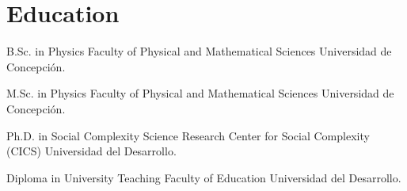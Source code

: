 \section{Education}
            {B.Sc. in Physics}
            {Faculty of Physical and Mathematical Sciences}
            {Universidad de Concepción.}
            {}
            {} 

    \vspace{8pt}
    
            {M.Sc. in Physics}
            {Faculty of Physical and Mathematical Sciences}
            {Universidad de Concepción.}
            {}
            {}
            
    \vspace{8pt}
    
            {Ph.D. in Social Complexity Science}
            {Research Center for Social Complexity (CICS)} %
            {Universidad del Desarrollo.}
            {}
            {}

    \vspace{8pt}

            {Diploma in University Teaching}
            {Faculty of Education}
            {Universidad del Desarrollo.}
            {}
            {}
